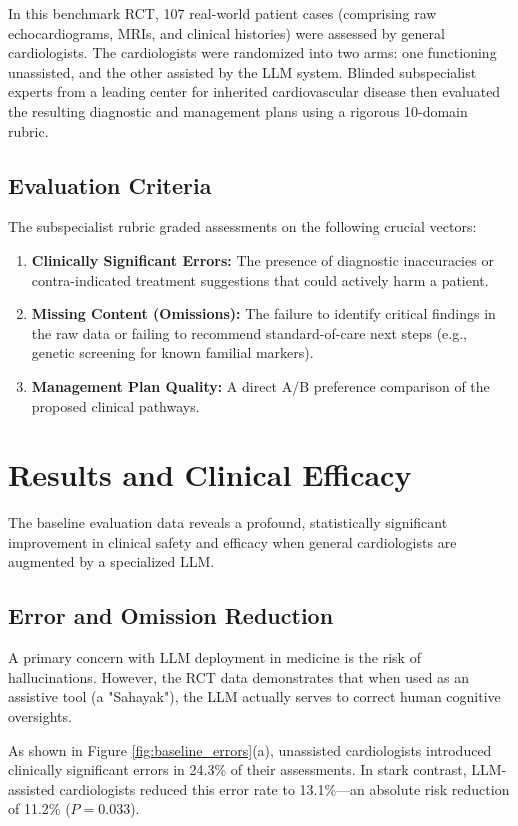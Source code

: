 \documentclass[11pt,a4paper]{article}
\begin{document}
In this benchmark RCT, 107 real-world patient cases (comprising raw echocardiograms, MRIs, and clinical histories) were assessed by general cardiologists. The cardiologists were randomized into two arms: one functioning unassisted, and the other assisted by the LLM system. Blinded subspecialist experts from a leading center for inherited cardiovascular disease then evaluated the resulting diagnostic and management plans using a rigorous 10-domain rubric.

\subsection{Evaluation Criteria}
The subspecialist rubric graded assessments on the following crucial vectors:
\begin{enumerate}
    \item \textbf{Clinically Significant Errors:} The presence of diagnostic inaccuracies or contra-indicated treatment suggestions that could actively harm a patient.
    \item \textbf{Missing Content (Omissions):} The failure to identify critical findings in the raw data or failing to recommend standard-of-care next steps (e.g., genetic screening for known familial markers).
    \item \textbf{Management Plan Quality:} A direct A/B preference comparison of the proposed clinical pathways.
\end{enumerate}

\section{Results and Clinical Efficacy}

The baseline evaluation data reveals a profound, statistically significant improvement in clinical safety and efficacy when general cardiologists are augmented by a specialized LLM.

\subsection{Error and Omission Reduction}
A primary concern with LLM deployment in medicine is the risk of hallucinations. However, the RCT data demonstrates that when used as an assistive tool (a "Sahayak"), the LLM actually serves to correct human cognitive oversights. 

As shown in Figure \ref{fig:baseline_errors}(a), unassisted cardiologists introduced clinically significant errors in 24.3\% of their assessments. In stark contrast, LLM-assisted cardiologists reduced this error rate to 13.1\%---an absolute risk reduction of 11.2\% ($P=0.033$). 
\end{document}
